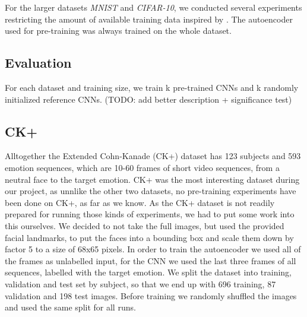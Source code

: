 \documentclass{article}
\begin{document}
    For the larger datasets \emph{MNIST} and \emph{CIFAR-10}, we conducted several experiments restricting the amount of available training data inspired by \citep{masci11}. The autoencoder used for pre-training was always trained on the whole dataset. 


  \subsection{Evaluation}
    For each dataset and training size, we train k pre-trained CNNs and k randomly initialized reference CNNs.
    (TODO: add better description + significance test)

  \subsection{CK+}
      Alltogether the Extended Cohn-Kanade (CK+) dataset \citep{kanade2000comprehensive,lucey2010extended} has 123 subjects and 593 emotion sequences, which are 10-60 frames of short video sequences, from a neutral face to the target emotion.
      CK+ was the most interesting dataset during our project, as unnlike the other two datasets, no pre-training experiments have been done on CK+, as far as we know.
      As the CK+ dataset is not readily prepared for running those kinds of experiments, we had to put some work into this ourselves.
      We decided to not take the full images, but used the provided facial landmarks, to put the faces into a bounding box and scale them down by factor 5 to a size of 68x65 pixels.
      In order to train the autoencoder we used all of the frames as unlabelled input, for the CNN we used the last three frames of all sequences, labelled with the target emotion.
      We split the dataset into training, validation and test set by subject, so that we end up with 696 training, 87 validation and 198 test images.
      Before training we randomly shuffled the images and used the same split for all runs.
\end{document}
